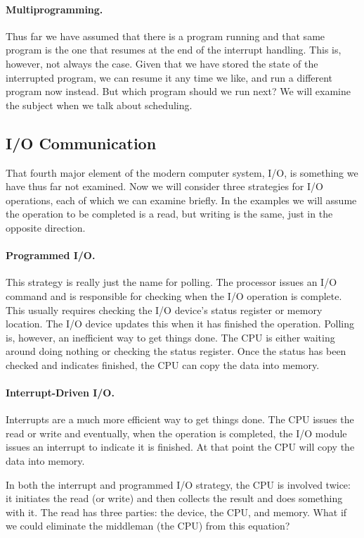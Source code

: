 \paragraph{Multiprogramming.} Thus far we have assumed that there is a program running and that same program is the one that resumes at the end of the interrupt handling. This is, however, not always the case. Given that we have stored the state of the interrupted program, we can resume it any time we like, and run a different program now instead. But which program should we run next? We will examine the subject when we talk about scheduling.

\subsection*{I/O Communication}
That fourth major element of the modern computer system, I/O, is something we have thus far not examined. Now we will consider three strategies for I/O operations, each of which we can examine briefly. In the examples we will assume the operation to be completed is a read, but writing is the same, just in the opposite direction.

\paragraph{Programmed I/O.}  This strategy is really just the name for polling. The processor issues an I/O command and is responsible for checking when the I/O operation is complete. This usually requires checking the I/O device's status register or memory location. The I/O device updates this when it has finished the operation. Polling is, however, an inefficient way to get things done. The CPU is either waiting around doing nothing or checking the status register. Once the status has been checked and indicates finished, the CPU can copy the data into memory.

\paragraph{Interrupt-Driven I/O.} Interrupts are a much more efficient way to get things done. The CPU issues the read or write and eventually, when the operation is completed, the I/O module issues an interrupt to indicate it is finished. At that point the CPU will copy the data into memory.

In both the interrupt and programmed I/O strategy, the CPU is involved twice: it initiates the read (or write) and then collects the result and does something with it. The read has three parties: the device, the CPU, and memory. What if we could eliminate the middleman (the CPU) from this equation?

